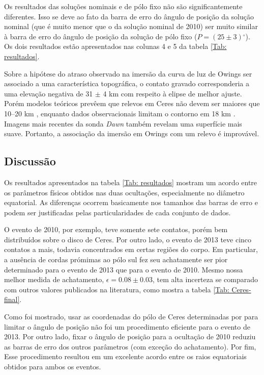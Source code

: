 \documentclass[12pt,a4paper]{monografia}
\newcommand{\degr}{\ensuremath{^{\circ}}}%
\begin{document}
Os resultados das soluções nominais e de pólo fixo não são significantemente diferentes. Isso se deve ao fato da barra de erro do ângulo de posição da solução nominal (que é muito menor que o da solução nominal de 2010) ser muito similar à barra de erro do ângulo de posição da solução de pólo fixo ($P = (25 \pm 3)\degr$). Os dois resultados estão apresentados nas colunas 4 e 5 da tabela \ref{Tab: resultados}.

Sobre a hipótese do atraso observado na imersão da curva de luz de Owings ser associado a uma característica topográfica, o contato gravado corresponderia a uma elevação negativa de 31 $\pm$ 4 km com respeito à elipse de melhor ajuste. Porém modelos teóricos prevêem que relevos em Ceres não devem ser maiores que 10--20 km \citep{Johnson1973}, enquanto dados observacionais limitam o contorno em 18 km \citep{Carry2008}. Imagens mais recentes da sonda \textit{Dawn} também revelam uma superfície mais suave. Portanto, a associação da imersão em Owings com um relevo é improvável.

\subsection{Discussão}

\indent \indent Os resultados apresentados na tabela \ref{Tab: resultados} mostram um acordo entre os parâmetros físicos obtidos nas duas ocultações, especialmente no diâmetro equatorial. As diferenças ocorrem basicamente nos tamanhos das barras de erro e podem ser justificadas pelas particularidades de cada conjunto de dados.

O evento de 2010, por exemplo, teve somente sete contatos, porém bem distribuídos sobre o disco de Ceres. Por outro lado, o evento de 2013 teve cinco contatos a mais, todavia concentrados em certas regiões do corpo. Em particular, a ausência de cordas prómimas ao pólo sul fez seu achatamente ser pior determinado para o evento de 2013 que para o evento de 2010. Mesmo nossa melhor medida de achatamento, $\epsilon=0.08 \pm 0.03$, tem alta incerteza se comparado com outros valores publicados na literatura, como mostra a tabela \ref{Tab: Ceres-final}.

Como foi mostrado, usar as coordenadas do pólo de Ceres determinadas por \cite{Drummond2014} para limitar o ângulo de posição não foi um procedimento eficiente para o evento de 2013. Por outro lado, fixar o ângulo de posição para a ocultação de 2010 reduziu as barras de erro dos outros parâmetros (com exceção do achatamento). Por fim, Esse procedimento resultou em um excelente acordo entre os raios equatoriais obtidos para ambos os eventos.
\end{document}
